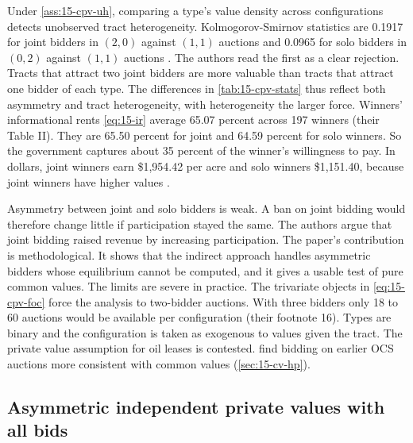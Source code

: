  Under \cref{ass:15-cpv-uh}, comparing a type's value density
across configurations detects unobserved tract heterogeneity. Kolmogorov-Smirnov statistics are 0.1917 for
joint bidders in $(2,0)$ against $(1,1)$ auctions and 0.0965 for solo bidders in $(0,2)$ against $(1,1)$
auctions \citep[p.~200]{CampoPerrigneVuong2003}. The authors read the first as a clear rejection. Tracts
that attract two joint bidders are more valuable than tracts that attract one bidder of each type. The
differences in \cref{tab:15-cpv-stats} thus reflect both asymmetry and tract heterogeneity, with
heterogeneity the larger force. Winners' informational rents \eqref{eq:15-ir} average 65.07 percent across 197
winners (their Table II). They are 65.50 percent for joint and 64.59 percent for solo winners. So the
government captures about 35 percent of the winner's willingness to pay. In dollars, joint winners earn
\$1,954.42 per acre and solo winners \$1,151.40, because joint winners have higher values
\citep[p.~201]{CampoPerrigneVuong2003}.

 Asymmetry between joint and solo bidders is weak. A ban on joint bidding
would therefore change little if participation stayed the same. The authors argue that joint bidding raised
revenue by increasing participation. The paper's contribution is methodological. It shows that the indirect
approach handles asymmetric bidders whose equilibrium cannot be computed, and it gives a usable test of pure
common values. The limits are severe in practice. The trivariate objects in \eqref{eq:15-cpv-foc} force the
analysis to two-bidder auctions. With three bidders only 18 to 60 auctions would be available per
configuration (their footnote 16). Types are binary and the configuration is taken as exogenous to values
given the tract. The private value assumption for oil leases is contested. \citet{HendricksPinksePorter2003}
find bidding on earlier OCS auctions more consistent with common values (\cref{sec:15-cv-hp}).

\subsection{Asymmetric independent private values with all bids}\label{sec:15-apv-asym}

